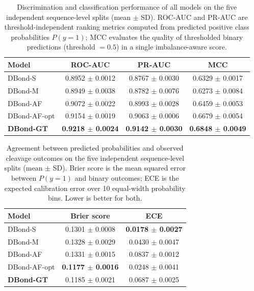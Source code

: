 \begin{table}[t]
\centering
\caption{Discrimination and classification performance of all models on the
five independent sequence-level splits (mean $\pm$ SD). ROC-AUC and PR-AUC
are threshold-independent ranking metrics computed from predicted positive
class probabilities $P(y=1)$; MCC evaluates the quality of thresholded
binary predictions (threshold $= 0.5$) in a single imbalance-aware score.}
\label{tab:discrimination}
\begin{tabular}{lccc}
\toprule
Model         & ROC-AUC              & PR-AUC               & MCC                  \\
\midrule
DBond-S       & 0.8952 $\pm$ 0.0012  & 0.8767 $\pm$ 0.0030  & 0.6329 $\pm$ 0.0017  \\
DBond-M       & 0.8949 $\pm$ 0.0038  & 0.8782 $\pm$ 0.0076  & 0.6273 $\pm$ 0.0084  \\
DBond-AF      & 0.9072 $\pm$ 0.0022  & 0.8993 $\pm$ 0.0028  & 0.6459 $\pm$ 0.0053  \\
DBond-AF-opt  & 0.9154 $\pm$ 0.0019  & 0.9063 $\pm$ 0.0006  & 0.6679 $\pm$ 0.0054  \\
\midrule
\textbf{DBond-GT} & \textbf{0.9218 $\pm$ 0.0024} & \textbf{0.9142 $\pm$ 0.0030} & \textbf{0.6848 $\pm$ 0.0049} \\
\bottomrule
\end{tabular}
\end{table}

\begin{table}[t]
\centering
\caption{Agreement between predicted probabilities and observed cleavage
outcomes on the five independent sequence-level splits (mean $\pm$ SD).
Brier score is the mean squared error between $P(y=1)$ and binary outcomes;
ECE is the expected calibration error over 10 equal-width probability bins.
Lower is better for both.}
\label{tab:calibration}
\begin{tabular}{lcc}
\toprule
Model         & Brier score          & ECE                  \\
\midrule
DBond-S       & 0.1301 $\pm$ 0.0008  & \textbf{0.0178 $\pm$ 0.0027} \\
DBond-M       & 0.1328 $\pm$ 0.0029  & 0.0430 $\pm$ 0.0047  \\
DBond-AF      & 0.1331 $\pm$ 0.0015  & 0.0837 $\pm$ 0.0012  \\
DBond-AF-opt  & \textbf{0.1177 $\pm$ 0.0016}  & 0.0248 $\pm$ 0.0041  \\
\midrule
\textbf{DBond-GT} & 0.1185 $\pm$ 0.0021 & 0.0687 $\pm$ 0.0025 \\
\bottomrule
\end{tabular}
\end{table}

